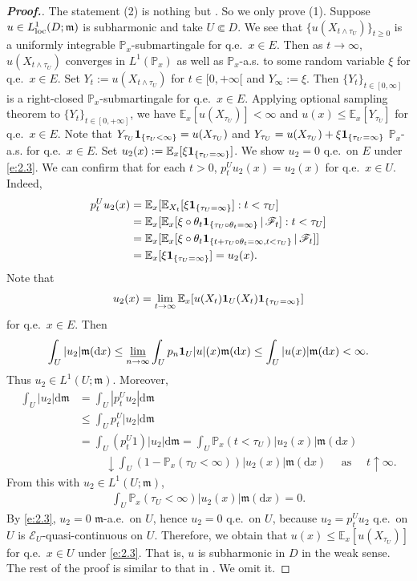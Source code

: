 \documentclass[12pt,a4paper]{article}
\renewcommand{\P}{\mathbb{P}}
\newcommand{\E}{\mathbb{E}}
\renewcommand{\d}{\mathrm{d}}
\newcommand{\m}{\mathfrak{m} }
\newcommand{\loc}{{\rm loc}}
\newcommand{\1}{{\bf 1}}
\begin{document}
\begin{proof}[{\bf Proof.}]
The statement (2) is nothing but \cite[Lemma~3.9(ii)]{CK}. 
So we only prove (1). Suppose $u\in L^1_{\loc}(D;{\m})$ is subharmonic 
and take $U\Subset D$. 
We see 
that $\{u(X_{t\land\tau_U})\}_{t\geq0}$ is a uniformly integrable $\P_x$-submartingale for q.e.~$x\in E$. Then as $t\to\infty$, $u(X_{t\land\tau_U})$ converges in $L^1(\P_x)$ as well as $\P_x$-a.s. to some random variable $\xi$ for q.e.~$x\in E$. Set $Y_t:=u(X_{t\land\tau_U})$ for $t\in[0,+\infty[$ and $Y_{\infty}:=\xi$. Then $\{Y_t\}_{t\in[0,\infty]}$ is a right-closed $\P_x$-submartingale for q.e.~$x\in E$. Applying optional sampling theorem to $\{Y_t\}_{t\in[0,+\infty]}$, we have $\E_x[u(X_{\tau_U})]<\infty$ and $u(x)\leq\E_x[Y_{\tau_U}]$ for q.e.~$x\in E$. Note that $Y_{\tau_U}\1_{\{\tau_U<\infty\}}=u(X_{\tau_U})$ and 
$Y_{\tau_U}=u(X_{\tau_U})+\xi\1_{\{\tau_U=\infty\}}$ $\P_x$-a.s. for q.e.~$x\in E$. Set $u_2(x):= \E_x[\xi\1_{\{\tau_U=\infty\}}]$. 
We show $u_2=0$ q.e.~on $E$ under \eqref{e:2.3}. We can confirm that for each $t>0$, $p_t^Uu_2(x)=u_2(x)$ for q.e.~$x\in U$. 
Indeed, 
\begin{align*}
p_t^Uu_2(x)&=\mathbb{E}_x[\mathbb{E}_{X_t}[\xi\1_{\{\tau_U=\infty\}}]:t<\tau_U]\\
&=\mathbb{E}_x[\mathbb{E}_x[\xi\circ\theta_t
\1_{\{\tau_U\circ\theta_t=\infty\}}\,|\,\mathscr{F}_t]:t<\tau_U]\\
&=\mathbb{E}_x[\mathbb{E}_x[\xi\circ\theta_t\1_{\{t+\tau_U\circ\theta_t=\infty,t<\tau_U\}}\,|\,\mathscr{F}_t]]\\
&=\mathbb{E}_x[\xi\1_{\{\tau_U=\infty\}}]=u_2(x).
\end{align*}
Note that 
\begin{align*}
u_2(x)=\lim_{t\to\infty}\E_x[u(X_t)\1_U(X_t)\1_{\{\tau_U=\infty\}}]
\end{align*}
for q.e.~$x\in E$. Then
\begin{align*}
\int_U|u_2|{\m}({\d} x)\leq\varliminf_{n\to\infty}\int_Up_n\1_U|u|(x){\m}({\d} x)\leq\int_U|u(x)|{\m}({\d} x)<\infty.
\end{align*}
Thus $u_2\in L^1(U;{\m})$. Moreover, 
\begin{align*}
\int_U|u_2|{\d}{\m}&=\int_U|p_t^Uu_2|{\d}{\m}\\
&\leq \int_Up_t^U|u_2|{\d}{\m}\\
&=\int_U(p_t^U1)|u_2|{\d}{\m}=\int_U\P_x(t<\tau_U)|u_2(x)|{\m}({\d} x)\\
&\hspace{1cm}\downarrow\int_U(1-\P_x(\tau_U<\infty))|u_2(x)|{\m}({\d} x)\quad \text{ as }\quad t\uparrow\infty.
\end{align*}
From this with $u_2\in L^1(U;{\m})$, 
\begin{align*}
\int_U\P_x(\tau_U<\infty)|u_2(x)|{\m}({\d} x)=0.
\end{align*}
By \eqref{e:2.3}, $u_2=0$ ${\m}$-a.e.~on $U$, hence $u_2=0$ q.e.~on $U$, because $u_2=p_t^Uu_2$ q.e.~on $U$ is $\mathscr{E}_U$-quasi-continuous 
on $U$.   
Therefore, we obtain that $u(x)\leq\E_x[u(X_{\tau_U})]$ for q.e.~$x\in U$ 
under  \eqref{e:2.3}. That is, $u$ is subharmonic in $D$ in the weak sense. 
The rest of the proof is similar to that in \cite[Lemma~3.9(i)]{CK}. We omit it. 
\end{proof}
\end{document}
